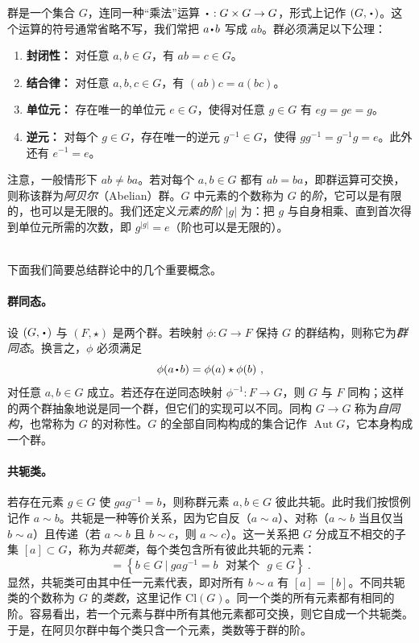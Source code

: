 \documentclass[11pt,a4paper,fontset=windows]{ctexart}
\numberwithin{equation}{section}
\newcommand{\Aut}{\operatorname{\text{Aut}}}      %
\newcommand*{\bcdot}{\raisebox{-0.6ex}{\scalebox{2}{$\cdot$}}}
\newcommand{\myparagraph}[1]{\paragraph{#1}\mbox\\}
\newcommand{\Cl}{\text{Cl}}
\begin{document}
群是一个集合 $G$，连同一种“乘法”运算 $\bcdot:G\times G\rightarrow G$，形式上记作 $(G,\bcdot)$。这个运算的符号通常省略不写，我们常把 $a\bcdot b$ 写成 $ab$。群必须满足以下公理：
\begin{enumerate}
\item \textbf{封闭性：} 对任意 $a,b\in G$，有 $ab=c\in G$。
\item \textbf{结合律：} 对任意 $a,b,c\in G$，有 $(ab)c=a(bc)$。
\item \textbf{单位元：} 存在唯一的单位元 $e\in G$，使得对任意 $g\in G$ 有 $eg=ge=g$。
\item \textbf{逆元：} 对每个 $g\in G$，存在唯一的逆元 $g^{-1}\in G$，使得 $gg^{-1}=g^{-1}g=e$。此外还有 $e^{-1}=e$。
\end{enumerate}


注意，一般情形下 $ab\neq ba$。若对每个 $a,b\in G$ 都有 $ab=ba$，即群运算可交换，则称该群为\emph{阿贝尔}（Abelian）群。$G$ 中元素的个数称为 $G$ 的\emph{阶}，它可以是有限的，也可以是无限的。我们还定义\emph{元素的阶} $|g|$ 为：把 $g$ 与自身相乘、直到首次得到单位元所需的次数，即 $g^{|g|}=e$（阶也可以是无限的）。

~\\
下面我们简要总结群论中的几个重要概念。

\myparagraph{群同态。}
设 $(G,\bcdot)$ 与 $(F,\star)$ 是两个群。若映射 $\phi:G\rightarrow F$ 保持 $G$ 的群结构，则称它为\emph{群同态}。换言之，$\phi$ 必须满足
\begin{equation}
\phi(a\bcdot b)=\phi(a)\star\phi(b)~,
\end{equation}
对任意 $a,b\in G$ 成立。若还存在逆同态映射 $\phi^{-1}:F\rightarrow G$，则 $G$ 与 $F$ 同构；这样的两个群抽象地说是同一个群，但它们的实现可以不同。同构 $G\rightarrow G$ 称为\emph{自同构}，也常称为 $G$ 的对称性。$G$ 的全部自同构构成的集合记作 $\Aut G$，它本身构成一个群。

\myparagraph{共轭类。}
若存在元素 $g\in G$ 使 $gag^{-1}=b$，则称群元素 $a,b\in G$ 彼此共轭。此时我们按惯例记作 $a\sim b$。共轭是一种等价关系，因为它自反（$a\sim a$）、对称（$a\sim b$ 当且仅当 $b\sim a$）且传递（若 $a\sim b$ 且 $b\sim c$，则 $a\sim c$）。这一关系把 $G$ 分成互不相交的子集 $[a]\subset G$，称为\emph{共轭类}，每个类包含所有彼此共轭的元素：
\begin{equation}
[a]=\left\lbrace b\in G~|~gag^{-1}=b\text{~~对某个~~}g\in G\right\rbrace~.
\end{equation}
显然，共轭类可由其中任一元素代表，即对所有 $b\sim a$ 有 $[a]=[b]$。不同共轭类的个数称为 $G$ 的\emph{类数}，这里记作 $\Cl(G)$。同一个类的所有元素都有相同的阶。容易看出，若一个元素与群中所有其他元素都可交换，则它自成一个共轭类。于是，在阿贝尔群中每个类只含一个元素，类数等于群的阶。
\end{document}
